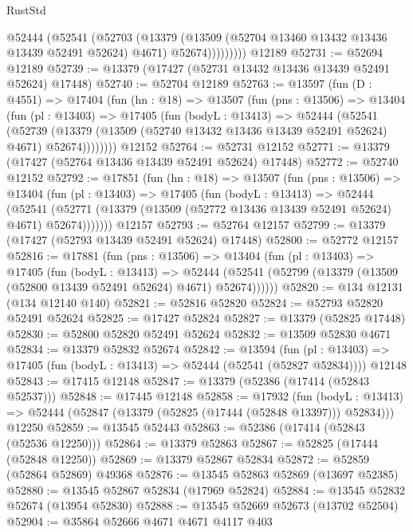\begin{lexlean}{RustStd}
\begin{coremodule}
              @52444
                (@52541
                  (@52703
                    (@13379
                      (@13509 (@52704 @13460 @13432 @13436 @13439 @52491 @52624) @4671)
                      @52674)))))))))
    @12189
@52731 := @52694 @12189
@52739 := @13379 (@17427 (@52731 @13432 @13436 @13439 @52491 @52624) @17448)
@52740 := @52704 @12189
@52763 := @13597
    (fun (D : @4551) =>
    @17404
      (fun (hn : @18) =>
      @13507
        (fun (pns : @13506) =>
        @13404
          (fun (pl : @13403) =>
          @17405
            (fun (bodyL : @13413) =>
            @52444
              (@52541
                (@52739
                  (@13379 (@13509 (@52740 @13432 @13436 @13439 @52491 @52624) @4671) @52674))))))))
    @12152
@52764 := @52731 @12152
@52771 := @13379 (@17427 (@52764 @13436 @13439 @52491 @52624) @17448)
@52772 := @52740 @12152
@52792 := @17851
    (fun (hn : @18) =>
    @13507
      (fun (pns : @13506) =>
      @13404
        (fun (pl : @13403) =>
        @17405
          (fun (bodyL : @13413) =>
          @52444
            (@52541
              (@52771 (@13379 (@13509 (@52772 @13436 @13439 @52491 @52624) @4671) @52674)))))))
    @12157
@52793 := @52764 @12157
@52799 := @13379 (@17427 (@52793 @13439 @52491 @52624) @17448)
@52800 := @52772 @12157
@52816 := @17881
    (fun (pns : @13506) =>
    @13404
      (fun (pl : @13403) =>
      @17405
        (fun (bodyL : @13413) =>
        @52444 (@52541 (@52799 (@13379 (@13509 (@52800 @13439 @52491 @52624) @4671) @52674))))))
@52820 := @134 @12131 (@134 @12140 @140)
@52821 := @52816 @52820
@52824 := @52793 @52820 @52491 @52624
@52825 := @17427 @52824
@52827 := @13379 (@52825 @17448)
@52830 := @52800 @52820 @52491 @52624
@52832 := @13509 @52830 @4671
@52834 := @13379 @52832 @52674
@52842 := @13594
    (fun (pl : @13403) => @17405 (fun (bodyL : @13413) => @52444 (@52541 (@52827 @52834))))
    @12148
@52843 := @17415 @12148
@52847 := @13379 (@52386 (@17414 (@52843 @52537)))
@52848 := @17445 @12148
@52858 := @17932
    (fun (bodyL : @13413) => @52444 (@52847 (@13379 (@52825 (@17444 (@52848 @13397))) @52834)))
    @12250
@52859 := @13545 @52443
@52863 := @52386 (@17414 (@52843 (@52536 @12250)))
@52864 := @13379 @52863
@52867 := @52825 (@17444 (@52848 @12250))
@52869 := @13379 @52867 @52834
@52872 := @52859 (@52864 @52869) @49368
@52876 := @13545 @52863 @52869 (@13697 @52385)
@52880 := @13545 @52867 @52834 (@17969 @52824)
@52884 := @13545 @52832 @52674 (@13954 @52830)
@52888 := @13545 @52669 @52673 (@13702 @52504)
@52904 := @35864
    @52666
    @4671
    @4671
    @4117
    @403

\end{coremodule}
\end{lexlean}
